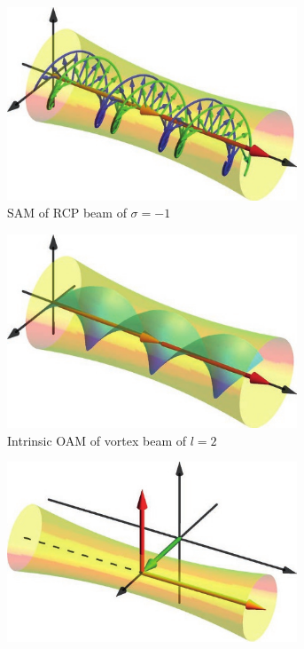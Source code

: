 \documentclass[11pt,a4paper]{article}
\numberwithin{equation}{section}
\begin{document}
\begin{figure}[H]
	\begin{subfigure}[H]{0.32\textwidth}
		\centering
		\includegraphics[width=0.95\textwidth]{sam.png}
		\caption{SAM of RCP beam of $\sigma=-1$}
		\label{fig:sam}
	\end{subfigure}
	\hfil
	\begin{subfigure}[H]{0.31\textwidth}
		\centering
		\includegraphics[width=0.95\textwidth]{ioam.png}
		\caption{Intrinsic OAM of vortex beam of $l=2$}
		\label{fig:ioam}
	\end{subfigure}
	\hfil
	\begin{subfigure}[H]{0.31\textwidth}
		\centering
		\includegraphics[width=0.95\textwidth]{eoam.png}

\end{subfigure}
\end{figure}
\end{document}

